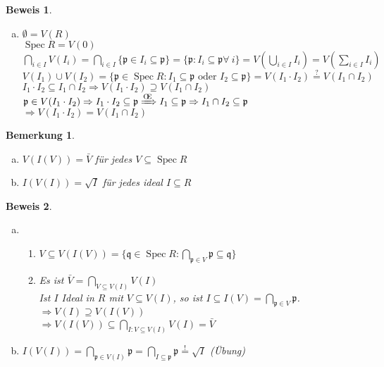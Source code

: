 \documentclass[paper = A4, fontsize=12pt, numbers=noendperiod, chapterprefix=true]{scrbook}
\theoremstyle{break}
\newtheorem{Bem}[Def]{Bemerkung}
\theoremstyle{nonumberbreak}
\newtheorem{bew}{Beweis}
\theoremstyle{nonumberplain}
\newcommand{\quot}[1]{\textrm{\glqq}{#1}\textrm{\grqq}}
\newcommand{\Sum}{\sum\limits}
\newenvironment{twosidedproof}{\begin{enumerate}[\quot{$\Rightarrow$}:]}{\end{enumerate}}
\newcommand{\proofsubseteq}{\item[\quot{$\subseteq$}:]}
\newcommand{\proofsupseteq}{\item[\quot{$\supseteq$}:]}
\DeclareMathOperator{\Spec}{Spec}
\newcommand{\p}{\mathfrak{p}} %
\newcommand{\q}{\mathfrak{q}} %
\renewcommand{\OE}{O\!\!E~}
\begin{document}
\begin{bew}\begin{enumerate}[a)]\item[c)]
$\emptyset = V(R)$\\
$\Spec R = V(0)$\\
$\bigcap\limits_{i\in I} V(I_i) = \bigcap\limits_{i\in I}\{\p \in I_i \subseteq \p\} = \{\p: I_i \subseteq \p \forall\  i\} = V(\bigcup\limits_{i\in I} I_i) = V(\Sum_{i\in I} I_i)$\\
$V(I_1)\cup V(I_2) = \{\p \in \Spec R: I_1 \subseteq \p \text{ oder } I_2 \subseteq \p\} = V(I_1\cdot I_2) \overset{?}{=} V(I_1\cap I_2)$\\
\hspace*{10mm} $I_1\cdot I_2 \subseteq I_1 \cap I_2 \Rightarrow V(I_1\cdot I_2) \supseteq V(I_1\cap I_2)$\\
\hspace*{10mm} $\p \in V(I_1\cdot I_2) \Rightarrow I_1\cdot I_2 \subseteq \p \xRightarrow{\text{\OE}} I_1 \subseteq \p \Rightarrow I_1\cap I_2 \subseteq \p$\\
$\Rightarrow V(I_1\cdot I_2) = V(I_1\cap I_2)$
\end{enumerate}\end{bew}

\begin{Bem}\begin{enumerate}[a)]
\item
  $V(I(V)) = \bar{V}$ f\"ur jedes $V\subseteq \Spec R$
\item
  $I(V(I)) = \sqrt{I}$ f\"ur jedes ideal $I\subseteq R$
\end{enumerate}\end{Bem}

\begin{bew}\begin{enumerate}[a)]
\item
  \begin{twosidedproof}
  \proofsupseteq
    $V\subseteq V(I(V)) = \{\q \in \Spec R: \bigcap\limits_{\p \in V} \p \subseteq \q \}$
  \proofsubseteq
    Es ist $\bar{V} = \bigcap\limits_{V\subseteq V(I)}V(I)$\\
    Ist $I$ Ideal in $R$ mit $V\subseteq V(I)$, so ist $I\subseteq I(V) = \bigcap\limits_{\p \in V} \p$.\\
    $\Rightarrow V(I) \supseteq V(I(V))$\\
    $\Rightarrow V(I(V)) \subseteq \bigcap\limits_{I:V\subseteq V(I)} V(I) = \bar{V}$
  \end{twosidedproof}
\item
  $I(V(I)) = \bigcap\limits_{\p \in V(I)} \p = \bigcap\limits_{I\subseteq \p} \p \overset{!}{=} \sqrt{I}$ (\"Ubung)
\end{enumerate}\end{bew}
\end{document}
